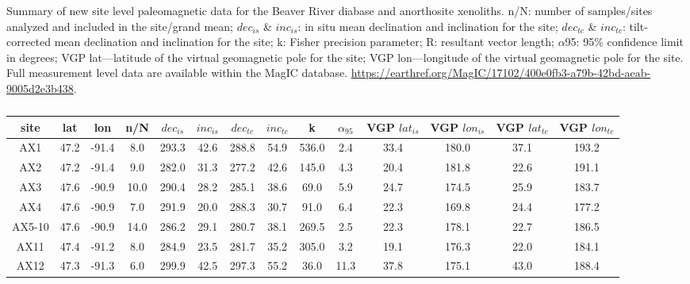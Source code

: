 \documentclass[draft]{agujournal2019}
\begin{document}
\begin{table}
\scriptsize
\caption\footnotesize{Summary of new site level paleomagnetic data for the Beaver River diabase and anorthosite xenoliths. n/N: number of samples/sites analyzed and included in the site/grand mean; $dec_{is}$ \& $inc_{is}$: in situ mean declination and inclination for the site; $dec_{tc}$ \& $inc_{tc}$: tilt-corrected mean declination and inclination for the site; k: Fisher precision parameter; R: resultant vector length; $\alpha$95: 95\% confidence limit in degrees; VGP lat—latitude of the virtual geomagnetic pole for the site; VGP lon—longitude of the virtual geomagnetic pole for the site. Full measurement level data are available within the MagIC database. \url{https://earthref.org/MagIC/17102/400e0fb3-a79b-42bd-aeab-9005d2e3b438}.}
\centering
\begin{tabular}{cccccccccccccc}
\hline
site             & lat  & lon   & n/N  & $dec_{is}$ & $inc_{is}$ & $dec_{tc}$ & $inc_{tc}$ & k     & $\alpha_{95}$ & VGP $lat_{is}$ & VGP $lon_{is}$ & VGP $lat_{tc}$ & VGP $lon_{tc}$ \\
\hline
AX1              & 47.2 & -91.4 & 8.0  & 293.3   & 42.6         & 288.8   & 54.9    & 536.0 & 2.4                     & 33.4        & 180.0       & 37.1         & 193.2        \\
AX2              & 47.2 & -91.4 & 9.0  & 282.0   & 31.3         & 277.2   & 42.6    & 145.0 & 4.3                     & 20.4        & 181.8       & 22.6         & 191.1        \\
AX3              & 47.6 & -90.9 & 10.0 & 290.4   & 28.2         & 285.1   & 38.6    & 69.0  & 5.9                     & 24.7        & 174.5       & 25.9         & 183.7        \\
AX4              & 47.6 & -90.9 & 7.0  & 291.9   & 20.0         & 288.3   & 30.7    & 91.0  & 6.4                     & 22.3        & 169.8       & 24.4         & 177.2        \\
AX5-10           & 47.6 & -90.9 & 14.0 & 286.2   & 29.1         & 280.7   & 38.1    & 269.5 & 2.5                     & 22.3        & 178.1       & 22.7         & 186.5        \\
AX11             & 47.4 & -91.2 & 8.0  & 284.9   & 23.5         & 281.7   & 35.2    & 305.0 & 3.2                     & 19.1        & 176.3       & 22.0         & 184.1        \\
AX12             & 47.3 & -91.3 & 6.0  & 299.9   & 42.5         & 297.3   & 55.2    & 36.0  & 11.3                    & 37.8        & 175.1       & 43.0         & 188.4        \\

\end{tabular}
\end{table}
\end{document}
